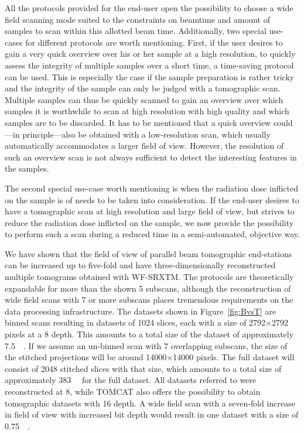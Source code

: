 All the protocols provided for the end-user open the possibility to choose a wide field scanning mode suited to the constraints on beamtime and amount of samples to scan within this allotted beam time. Additionally, two special use-cases for different protocols are worth mentioning. First, if the user desires to gain a very quick overview over his or her sample at a high resolution, \eg to quickly assess the integrity of multiple samples over a short time, a time-saving protocol can be used. This is especially the case if the sample preparation is rather tricky and the integrity of the sample can only be judged with a tomographic scan. Multiple samples can thus be quickly scanned to gain an overview over which samples it is worthwhile to scan at high resolution with high quality and which samples are to be discarded. It has to be mentioned that a quick overview could---in principle---also be obtained with a low-resolution scan, which usually automatically accommodates a larger field of view. However, the resolution of such an overview scan is not always sufficient to detect the interesting features in the samples.

The second special use-case worth mentioning is when the radiation dose inflicted on the sample is of needs to be taken into consideration. If the end-user desires to have a tomographic scan at high resolution and large field of view, but strives to reduce the radiation dose inflicted on the sample, we now provide the possibility to perform such a scan during a reduced time in a semi-automated, objective way.

We have shown that the field of view of parallel beam tomographic end-stations can be increased up to five-fold and have three-dimensionally reconstructed multiple tomograms obtained with WF-SRXTM. The protocols are theoretically expandable for more than the shown 5 subscans, although the reconstruction of wide field scans with 7 or more subscans places tremendous requirements on the data processing infrastructure. The datasets shown in Figure~\ref{fig:BvsT} are binned scans resulting in datasets of 1024 slices, each with a size of 2792$\times$2792 pixels at a \SI{8}{\bit} depth. This amounts to a total size of the dataset of approximately \SI{7.5}{\giga\byte}. If we assume an un-binned scan with 7 overlapping subscans, the size of the stitched projections will be around 14000$\times$14000 pixels. The full dataset will consist of 2048 stitched slices with that size, which amounts to a total size of approximately \SI{383}{\giga\byte} for the full dataset. All datasets referred to were reconstructed at \SI{8}{\bit}, while TOMCAT also offers the possibility to obtain tomographic datasets with \SI{16}{\bit} depth. A wide field scan with a seven-fold increase in field of view with increased bit depth would result in one dataset with a size of \SI{0.75}{\tera\byte}.

